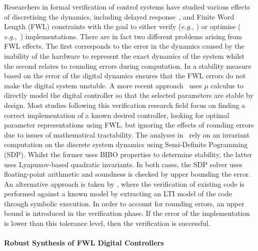 \documentclass{sig-alternate-05-2015}
\begin{document}
Researchers in formal verification of control systems have studied various
effects of discretising the dynamics, including delayed
response~\cite{Duggirala2015}, and Finite Word Length (FWL) constraints with
the goal to either verify ({\it e.g.}, \cite{daes20161}) or optimise ({\it
e.g.},~\cite{oudjida2014design}) implementations.  There are in fact two
different problems arising from FWL effects.  The first corresponds to the
error in the dynamics caused by the inability of the hardware to represent
the exact dynamics of the system whilst the second relates to rounding
errors during computation.  In \cite{fialho1994stability} a stability
measure based on the error of the digital dynamics ensures that the FWL
errors do not make the digital system unstable.  A more recent
approach~\cite{DBLP:journals/automatica/WuLCC09} uses $\mu$ calculus to
directly model the digital controller so that the selected parameters are
stable by design.  Most studies following this verification research field
focus on finding a correct implementation of a known desired controller,
looking for optimal parameter representations using FWL, but ignoring the
effects of rounding errors due to issues of mathematical tractability.  The
analyses in~\cite{DBLP:conf/hybrid/WangGRJF16,DBLP:conf/hybrid/RouxJG15}
rely on an invariant computation on the discrete system dynamics using
Semi-Definite Pogramming (SDP).  Whilst the former uses BIBO properties to
determine stability, the latter uses Lyapunov-based quadratic invariants. 
In both cases, the SDP solver uses floating-point arithmetic and soundness
is checked by upper bounding the error.  An alternative approach is taken by
\cite{park2016scalable}, where the verification of existing code is
performed against a known model by extracting an LTI model of the code
through symbolic execution.  In order to account for rounding errors, an
upper bound is introduced in the verification phase.  If the error of the
implementation is lower than this tolerance level, then the verification is
successful.

\paragraph{Robust Synthesis of FWL Digital Controllers}
\end{document}
